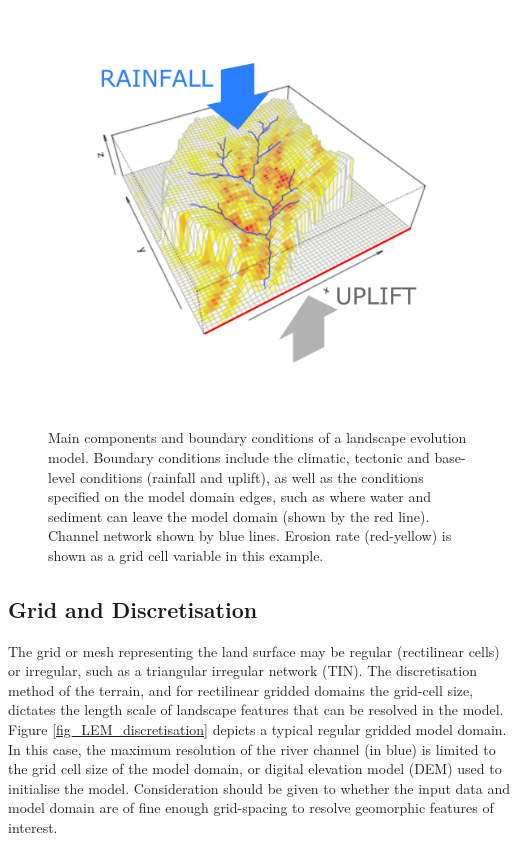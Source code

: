 \begin{figure}[t]
\includegraphics[width=11cm]{LEMFinalRevisedmanuscriptDAVFinalrevisions-img/LEMFinalRevisedmanuscriptDAVFinalrevisions-img004.png} 
\caption{Main components and boundary conditions of a landscape evolution model. Boundary conditions include the climatic, tectonic and base-level conditions (rainfall and uplift), as well as the conditions specified on the model domain edges, such as where water and sediment can leave the model domain (shown by the red line). Channel network shown by blue lines. Erosion rate (red-yellow) is shown as a grid cell variable in this example.}
\label{fig_main_LEM_components}
\end{figure}


\subsection{Grid and Discretisation}
The grid or mesh representing the land surface may be regular (rectilinear cells) or irregular, such as a triangular irregular network (TIN). The discretisation method of the terrain, and for rectilinear gridded domains the grid-cell size, dictates the length scale of landscape features that can be resolved in the model. Figure \ref{fig_LEM_discretisation} depicts a typical regular gridded model domain. In this case, the maximum resolution of the river channel (in blue) is limited to the grid cell size of the model domain, or digital elevation model (DEM) used to initialise the model. Consideration should be given to whether the input data and model domain are of fine enough grid-spacing to resolve geomorphic features of interest.

